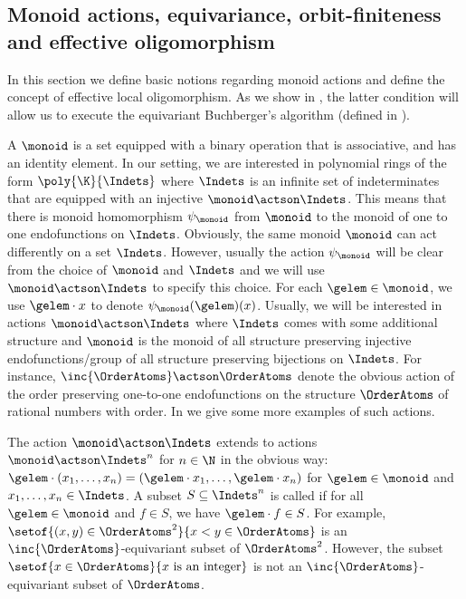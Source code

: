 \subsection{Monoid actions, equivariance, orbit-finiteness and effective oligomorphism} 
\AP
In this section we define basic notions regarding monoid actions and define the concept of effective local oligomorphism.
As we show in ,
the latter condition will allow us to execute the equivariant Buchberger's algorithm (defined in ).


A  $\monoid$ is a set equipped with a binary operation that is associative, and has an identity element.
In our setting, we are interested in polynomial rings of the form $\poly{\K}{\Indets}$ where $\Indets$ is an infinite set of indeterminates that are equipped with an injective  $\monoid \actson \Indets$.
This means that there is monoid homomorphism $\psi_{\monoid}$ from $\monoid$ to the monoid of one to one endofunctions on $\Indets$.
Obviously, the same monoid $\monoid$ can act differently on a set $\Indets$.
However, usually the action $\psi_{\monoid}$ will be clear from the choice of $\monoid$ and $\Indets$ and we will use $\monoid\actson\Indets$ to specify this choice.
For each $\gelem \in \monoid$, we use $\gelem\cdot x$ to denote $\psi_{\monoid}(\gelem)(x)$.
Usually, we will be interested in actions $\monoid\actson\Indets$ where $\Indets$ comes with some additional structure and $\monoid$ is the monoid of all structure preserving injective endofunctions/group of all structure preserving bijections on $\Indets$.
For instance, $\inc{\OrderAtoms}\actson\OrderAtoms$ denote the obvious action of the order preserving one-to-one endofunctions on the structure $\OrderAtoms$ of rational numbers with order.
In  we give some more examples of such actions.  

The action $\monoid\actson\Indets$ extends to actions $\monoid\actson\Indets^n$ for $n\in\N$ in the obvious way:
$\gelem\cdot(x_1,\dots,x_n) = (\gelem\cdot x_1,\dots,\gelem\cdot x_n)$ for $\gelem\in\monoid$ and $x_1,\dots,x_n\in\Indets$.
A subset $S \subseteq \Indets^n$ is called  if for all $\gelem \in \monoid$ and $f \in S$, we have $\gelem \cdot f\in S$.
For example, $\setof{(x,y)\in\OrderAtoms^2}{x < y \in \OrderAtoms}$ is an $\inc{\OrderAtoms}$-equivariant subset of $\OrderAtoms^2$.
However, the subset $\setof{x \in \OrderAtoms}{x \text{ is an integer}}$ is not an $\inc{\OrderAtoms}$-equivariant subset of $\OrderAtoms$.

